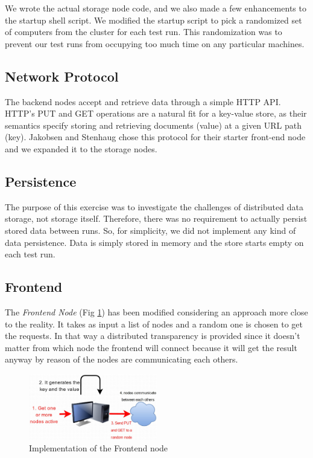 \documentclass[11pt,conference]{IEEEtran}
\begin{document}
We wrote the actual storage node code, and we also made a few enhancements to
the startup shell script. We modified the startup script to pick a randomized
set of computers from the cluster for each test run. This randomization was to
prevent our test runs from occupying too much time on any particular machines.


\subsection{Network Protocol}

The backend nodes accept and retrieve data through a simple HTTP API. HTTP's PUT
and GET operations are a natural fit for a key-value store, as their semantics
specify storing and retrieving documents (value) at a given URL path (key).
Jakobsen and Stenhaug chose this protocol for their starter front-end node and
we expanded it to the storage nodes.


\subsection{Persistence}

The purpose of this exercise was to investigate the challenges of distributed
data storage, not storage itself. Therefore, there was no requirement to
actually persist stored data between runs. So, for simplicity, we did not
implement any kind of data persistence. Data is simply stored in memory and the
store starts empty on each test run.

\subsection{Frontend}

The \textit{Frontend Node} (Fig \ref{fig:frontend}) has been modified considering an approach more close to the reality. It takes as input a list of nodes and a random one is chosen to get the requests.
In that way a distributed transparency is provided since it doesn't matter from which node the frontend will connect because it will get the result anyway by reason of the nodes are communicating each others.

\begin{figure}[h!]
  \centering
    \includegraphics[width=0.5\textwidth]{frontend}
    \caption{Implementation of the Frontend node}
    \label{fig:frontend}
\end{figure}
\end{document}
